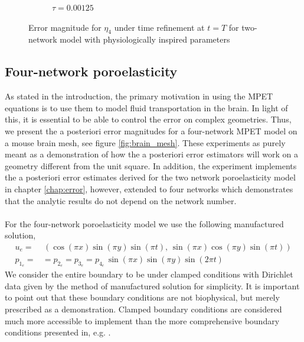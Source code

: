 \begin{figure}[h!]
\begin{subfigure}[b]{0.24\textwidth}
    \caption{$\tau=0.00125$}
  \end{subfigure}
  \caption{Error magnitude for $\eta_4$ under time refinement at $t=T$ for two-network model with physiologically inspired parameters} \label{fig:bb_bio_eta4}
\end{figure}
\clearpage

\subsection{Four-network poroelasticity} \label{test_mpet4}
As stated in the introduction, the primary motivation in using the MPET equations is to use them to model fluid transportation in the brain. In light of this, it is essential to be able to control the error on complex geometries. Thus, we present the a posteriori error magnitudes for a four-network MPET model on a mouse brain mesh, see figure \ref{fig:brain_mesh}. These experiments as purely meant as a demonstration of how the a posteriori error estimators will work on a geometry different from the unit square. In addition, the experiment implements the a posteriori error estimates derived for the two network poroelasticity model in chapter \ref{chap:error}, however, extended to four networks which demonstrates that the analytic results do not depend on the network number. 
\\
\\ 
For the four-network poroelasticity model we use the following manufactured solution,
\begin{align*}
u_e = & \, \left(\cos(\pi x)\sin(\pi y)\sin(\pi t), \, \sin( \pi x)\cos(\pi y)\sin(\pi t)\right) \\
p_{1_e} = & = p_{2_e} = p_{3_e} = p_{4_e} \,\sin(\pi x) \sin(\pi y)\sin(2\pi t)  
\end{align*}
We consider the entire boundary to be under clamped conditions with Dirichlet data given by the method of manufactured solution for simplicity. It is important to point out that these boundary conditions are not biophysical, but merely prescribed as a demonstration. Clamped boundary conditions are considered much more accessible to implement than the more comprehensive boundary conditions presented in, e.g. \cite{vardakis}. 
\\

